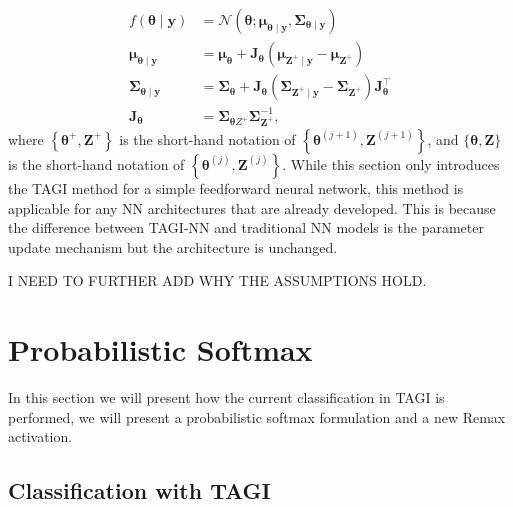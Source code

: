 \documentclass{article}
\begin{document}
\begin{equation*}
\begin{aligned}
f(\boldsymbol{\theta} \mid \boldsymbol{y}) &=\mathcal{N}\left(\boldsymbol{\theta} ; \boldsymbol{\mu}_{\boldsymbol{\theta} \mid \boldsymbol{y}}, \boldsymbol{\Sigma}_{\boldsymbol{\theta} \mid \boldsymbol{y}}\right) \\
\boldsymbol{\mu}_{\boldsymbol{\theta} \mid \boldsymbol{y}} &=\boldsymbol{\mu}_{\boldsymbol{\theta}}+\mathbf{J}_{\boldsymbol{\theta}}\left(\boldsymbol{\mu}_{\boldsymbol{Z}^{+} \mid \boldsymbol{y}}-\boldsymbol{\mu}_{\boldsymbol{Z}^{+}}\right) \\
\boldsymbol{\Sigma}_{\boldsymbol{\theta} \mid \boldsymbol{y}} &=\boldsymbol{\Sigma}_{\boldsymbol{\theta}}+\mathbf{J}_{\boldsymbol{\theta}}\left(\boldsymbol{\Sigma}_{\boldsymbol{Z}^{+} \mid \boldsymbol{y}}-\boldsymbol{\Sigma}_{\boldsymbol{Z}^{+}}\right) \mathbf{J}_{\boldsymbol{\theta}}^{\top} \\
\mathbf{J}_{\boldsymbol{\theta}} &=\boldsymbol{\Sigma}_{\boldsymbol{\theta} Z^{+}} \boldsymbol{\Sigma}_{\boldsymbol{Z}^{+}}^{-1},
\end{aligned}
\end{equation*}
where $\left\{\boldsymbol{\theta}^{+}, \boldsymbol{Z}^{+}\right\}$ is the short-hand notation of $\left\{\boldsymbol{\theta}^{(j+1)}, \boldsymbol{Z}^{(j+1)}\right\}$, and $\{\boldsymbol{\theta}, \boldsymbol{Z}\}$ is the short-hand notation of  $\left\{\boldsymbol{\theta}^{(j)}, \boldsymbol{Z}^{(j)}\right\}$.
While this section only introduces the TAGI method for a simple feedforward neural network, this method is applicable for any NN architectures that are already developed. This is because the difference between TAGI-NN and traditional NN models is the parameter update mechanism but the architecture is unchanged.

I NEED TO FURTHER ADD WHY THE ASSUMPTIONS HOLD.

\section{Probabilistic Softmax}

In this section we will present how the current classification in TAGI is performed, we will present a probabilistic softmax formulation and a new Remax activation.

\subsection{Classification with TAGI}\label{sub:classification_tagi}
\end{document}
